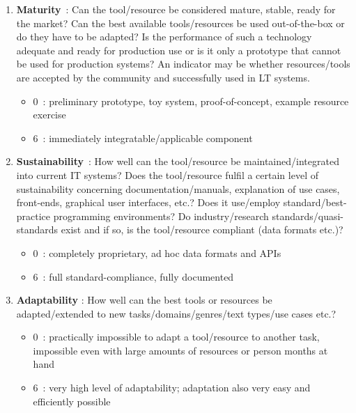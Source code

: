 \begin{multicols}{2}
\begin{enumerate}
\item {\bf Maturity}~: Can the tool/resource be considered mature, stable, ready for the market? Can the best available tools/resources be used out-of-the-box or do they have to be adapted? Is the performance of such a technology adequate and ready for production use or is it only a prototype that cannot be used for production systems? An indicator may be whether resources/tools are accepted by the community and successfully used in LT systems.  
     \begin{itemize}
      \item 0~: preliminary prototype, toy system, proof-of-concept, example resource exercise
      \item 6~: immediately integratable/applicable component
      \end{itemize}

\item {\bf Sustainability}~: How well can the tool/resource be maintained/integrated into current IT systems? Does the tool/resource fulfil a certain level of sustainability concerning documentation/manuals, explanation of use cases, front-ends, graphical user interfaces, etc.? Does it use/employ standard/best-practice programming environments? Do industry/research standards/quasi-standards exist and if so, is the tool/resource compliant (data formats etc.)?
      \begin{itemize}
      \item 0~: completely proprietary, ad hoc data formats and APIs
      \item 6~: full standard-compliance, fully documented
      \end{itemize}

\item {\bf Adaptability} : How well can the best tools or resources be adapted/extended to new tasks/domains/genres/text types/use cases etc.?
\begin{itemize}
      \item 0~: practically impossible to adapt a tool/resource to another task, impossible even with large amounts of resources or person months at hand
      \item 6~: very high level of adaptability; adaptation also very easy and efficiently possible
      \end{itemize}
\end{enumerate}


\end{multicols}
